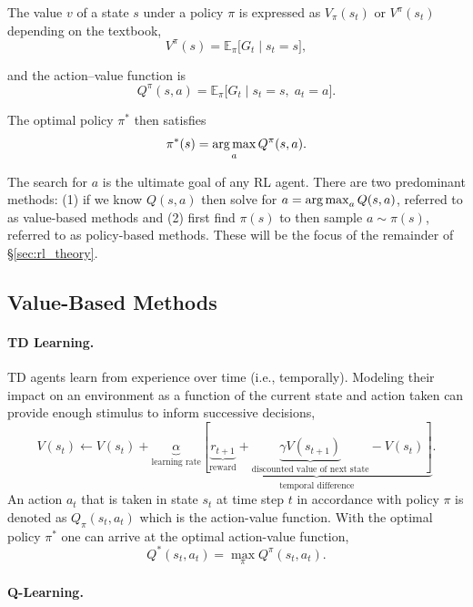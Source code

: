 The value $v$ of a state $s$ under a policy $\pi$ is expressed as $V_\pi(s_t)$ or $V^\pi(s_t)$ depending on the textbook,
\begin{equation*} 
    V^\pi(s) = \mathbb{E}_\pi\bigl[G_t \mid s_t = s\bigr],
\end{equation*}

and the action–value function is
\begin{equation*} 
    Q^\pi(s,a) = \mathbb{E}_\pi\bigl[G_t \mid s_t = s,\;a_t = a\bigr].
\end{equation*}

The optimal policy $\pi^*$ then satisfies
\begin{equation*} 
\pi^*(s) = \operatorname*{arg\,max}_a Q^\pi(s,a).
\end{equation*}

The search for $a$ is the ultimate goal of any \ac{RL} agent. There are two predominant methods: (1) if we know $Q(s,a)$ then solve for $a = \operatorname*{arg\,max}_a Q(s,a)$, referred to as value-based methods and (2) first find $\pi(s)$ to then sample $a \sim \pi(s)$, referred to as policy-based methods. These will be the focus of the remainder of \S\ref{sec:rl_theory}.

\subsection{Value-Based Methods}

\paragraph{TD Learning.}

\ac{TD} agents learn from experience over time (i.e., temporally). Modeling their impact on an environment as a function of the current state and action taken can provide enough stimulus to inform successive decisions, 
$$
V(s_t) \leftarrow V(s_t)+\underbrace{\alpha}_{\text{learning rate}}\underbrace{\left[\underbrace{r_{t+1}}_{\text{reward}} + \underbrace{\gamma V(s_{t+1})}_{\text{discounted value of next state}} - V(s_t)\right]}_{\text{temporal difference}}.
$$
An action $a_t$ that is taken in state $s_t$ at time step $t$ in accordance with policy $\pi$ is denoted as $Q_\pi(s_t,a_t)$ which is the action-value function. With the optimal policy $\pi^*$ one can arrive at the optimal action-value function,
$$
Q^*(s_t,a_t) = \max_\pi Q^\pi(s_t, a_t).
$$

\paragraph{Q-Learning.}

